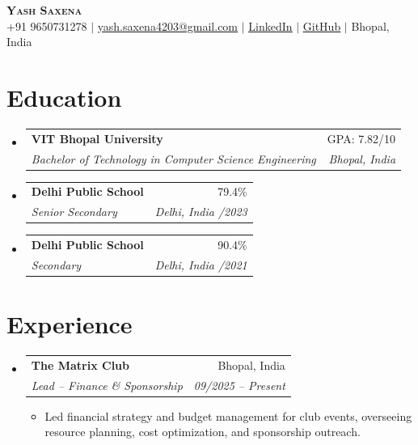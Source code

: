 ﻿\documentclass[letterpaper,10pt]{article}
\makeatletter
\newcommand{\resumeItem}[1]{
  \item\small{
    {#1 \vspace{-2pt}}
  }
}
\newcommand{\resumeSubheading}[4]{
  \vspace{-2pt}\item
    \begin{tabular*}{0.97\textwidth}[t]{l@{\extracolsep{\fill}}r}
      \textbf{#1} & #2 \\
      \textit{\small#3} & \textit{\small #4} \\
    \end{tabular*}\vspace{-7pt}
}
\newcommand{\resumeSubHeadingListStart}{\begin{itemize}[leftmargin=0.15in, label={}]}
\newcommand{\resumeSubHeadingListEnd}{\end{itemize}}
\newcommand{\resumeItemListStart}{\begin{itemize}}
\newcommand{\resumeItemListEnd}{\end{itemize}\vspace{-5pt}}
\makeatother
\begin{document}
\begin{center}
    \textbf{\Huge \scshape Yash Saxena} \\ \vspace{1pt}
    \small +91 9650731278 $|$ \href{mailto:yash.saxena4203@gmail.com}{\underline{yash.saxena4203@gmail.com}} $|$ 
    \href{https://www.linkedin.com/in/yash-saxena-5a6974279}{\underline{LinkedIn}} $|$
    \href{https://github.com/yashiscoding100}{\underline{GitHub}} $|$
    Bhopal, India
\end{center}

\section{Education}
  \resumeSubHeadingListStart
    \resumeSubheading
      {VIT Bhopal University}{GPA: 7.82/10}
      {Bachelor of Technology in Computer Science Engineering}{Bhopal, India}
    \vspace{2pt}
    \resumeSubheading
      {Delhi Public School}{79.4\%}
      {Senior Secondary}{Delhi, India \quad 05/2023}
    \vspace{2pt}
    \resumeSubheading
      {Delhi Public School}{90.4\%}
      {Secondary}{Delhi, India \quad 08/2021}
  \resumeSubHeadingListEnd

\section{Experience}
  \resumeSubHeadingListStart
    \resumeSubheading
      {The Matrix Club}{Bhopal, India}
      {Lead -- Finance \& Sponsorship}{09/2025 -- Present}
      \resumeItemListStart
        \resumeItem{Led financial strategy and budget management for club events, overseeing resource planning, cost optimization, and sponsorship outreach.}
      \resumeItemListEnd
  \resumeSubHeadingListEnd
\end{document}
